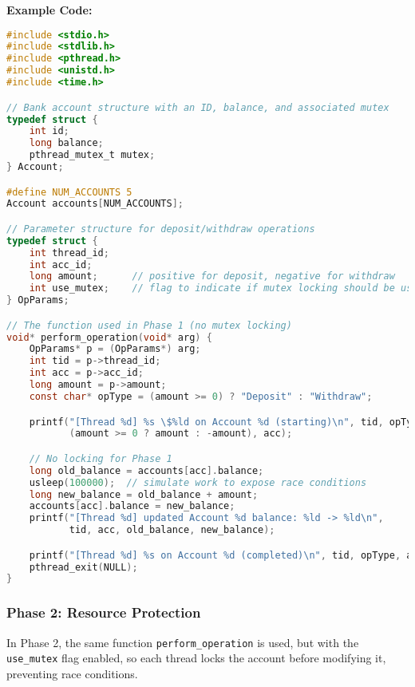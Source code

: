 \documentclass[11pt]{article}
\begin{document}
\textbf{Example Code:}
\begin{lstlisting}[language=C]
#include <stdio.h>
#include <stdlib.h>
#include <pthread.h>
#include <unistd.h>
#include <time.h>

// Bank account structure with an ID, balance, and associated mutex
typedef struct {
    int id;
    long balance;
    pthread_mutex_t mutex;
} Account;

#define NUM_ACCOUNTS 5
Account accounts[NUM_ACCOUNTS];

// Parameter structure for deposit/withdraw operations
typedef struct {
    int thread_id;
    int acc_id;
    long amount;      // positive for deposit, negative for withdraw
    int use_mutex;    // flag to indicate if mutex locking should be used
} OpParams;

// The function used in Phase 1 (no mutex locking)
void* perform_operation(void* arg) {
    OpParams* p = (OpParams*) arg;
    int tid = p->thread_id;
    int acc = p->acc_id;
    long amount = p->amount;
    const char* opType = (amount >= 0) ? "Deposit" : "Withdraw";

    printf("[Thread %d] %s \$%ld on Account %d (starting)\n", tid, opType,
           (amount >= 0 ? amount : -amount), acc);

    // No locking for Phase 1
    long old_balance = accounts[acc].balance;
    usleep(100000);  // simulate work to expose race conditions
    long new_balance = old_balance + amount;
    accounts[acc].balance = new_balance;
    printf("[Thread %d] updated Account %d balance: %ld -> %ld\n",
           tid, acc, old_balance, new_balance);

    printf("[Thread %d] %s on Account %d (completed)\n", tid, opType, acc);
    pthread_exit(NULL);
}
\end{lstlisting}

\subsubsection{Phase 2: Resource Protection}
In Phase 2, the same function \texttt{perform\_operation} is used, but with the \texttt{use\_mutex} flag enabled, so each thread locks the account before modifying it, preventing race conditions.
\end{document}
